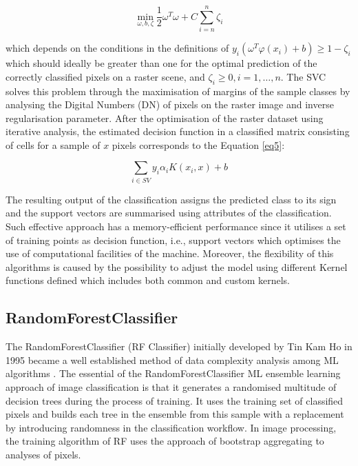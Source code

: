 \documentclass[final,5p,times,twocolumn]{elsarticle}
\begin{document}
\begin{equation}
\min_{\omega,b,\zeta}\frac{1}{2}\omega^T\omega+C\sum_{i=n}^{n}\zeta_{i}
\label{eq4}
\end{equation}

which depends on the conditions in the definitions of $y_{i}(\omega^{T}\varphi (x_i) + b)\geq 1-\zeta_{i}$ which should ideally be greater than one for the optimal prediction of the correctly classified pixels on a raster scene, and $\zeta_{i}\geq 0, i = 1,\dots,n$. The SVC solves this problem through the maximisation of margins of the sample classes by analysing the Digital Numbers (DN) of pixels on the raster image and inverse regularisation parameter. After the optimisation of the raster dataset using iterative analysis, the estimated decision function in a classified matrix consisting of cells for a sample of $x$ pixels corresponds to the Equation \ref{eq5}:

\begin{equation}
\sum_{i\in SV}y_{i}\alpha_{i}K(x_{i},x) + b
\label{eq5}
\end{equation}

The resulting output of the classification assigns the predicted class to its sign and the support vectors are summarised using attributes of the classification. Such effective approach has a memory-efficient performance since it utilises a set of training points as decision function, i.e., support vectors which optimises the use of computational facilities of the machine. Moreover, the flexibility of this algorithms is caused by the possibility to adjust the model using different Kernel functions defined which includes both common and custom kernels. 
 
\subsection{RandomForestClassifier}

The RandomForestClassifier (RF Classifier) initially developed by Tin Kam Ho in 1995 \cite{598994} became a well established method of data complexity analysis among ML algorithms \cite{990132}. The essential of the RandomForestClassifier ML ensemble learning approach of image classification is that it generates a randomised multitude of decision trees during the process of training. It uses the training set of classified pixels and builds each tree in the ensemble from this sample with a replacement by introducing randomness in the classification workflow. In image processing, the training algorithm of RF uses the approach of bootstrap aggregating to analyses of pixels. 
\end{document}
